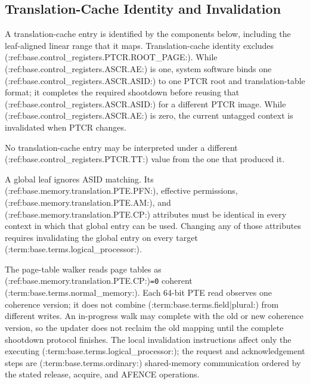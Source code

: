 \subsection{Translation-Cache Identity and Invalidation}
A translation-cache entry is identified by the components below, including the leaf-aligned linear range that it
maps. Translation-cache identity excludes (:ref:base.control_registers.PTCR.ROOT_PAGE:).
While (:ref:base.control_registers.ASCR.AE:) is one, system software binds one (:ref:base.control_registers.ASCR.ASID:) to one PTCR root and translation-table format; it completes the
required shootdown before reusing that (:ref:base.control_registers.ASCR.ASID:) for a different PTCR image. While (:ref:base.control_registers.ASCR.AE:) is zero, the current untagged
context is invalidated when PTCR changes.

No translation-cache entry may be interpreted under a different (:ref:base.control_registers.PTCR.TT:) value from the one that produced it.



A global leaf ignores ASID matching. Its (:ref:base.memory.translation.PTE.PFN:), effective permissions, (:ref:base.memory.translation.PTE.AM:), and (:ref:base.memory.translation.PTE.CP:) attributes must
be identical in every context in which that global entry can be used. Changing any of those attributes requires
invalidating the global entry on every target (:term:base.terms.logical_processor:).

The page-table walker reads page tables as (:ref:base.memory.translation.PTE.CP:)\texttt{=0} coherent (:term:base.terms.normal_memory:). Each 64-bit PTE read observes one coherence
version; it does not combine (:term:base.terms.field|plural:) from different writes. An in-progress walk may complete with the old or new
coherence version, so the updater does not reclaim the old mapping until the complete shootdown protocol finishes.
The local invalidation instructions affect only the executing (:term:base.terms.logical_processor:); the request and acknowledgement
steps are (:term:base.terms.ordinary:) shared-memory communication ordered by the stated release, acquire, and AFENCE operations.
